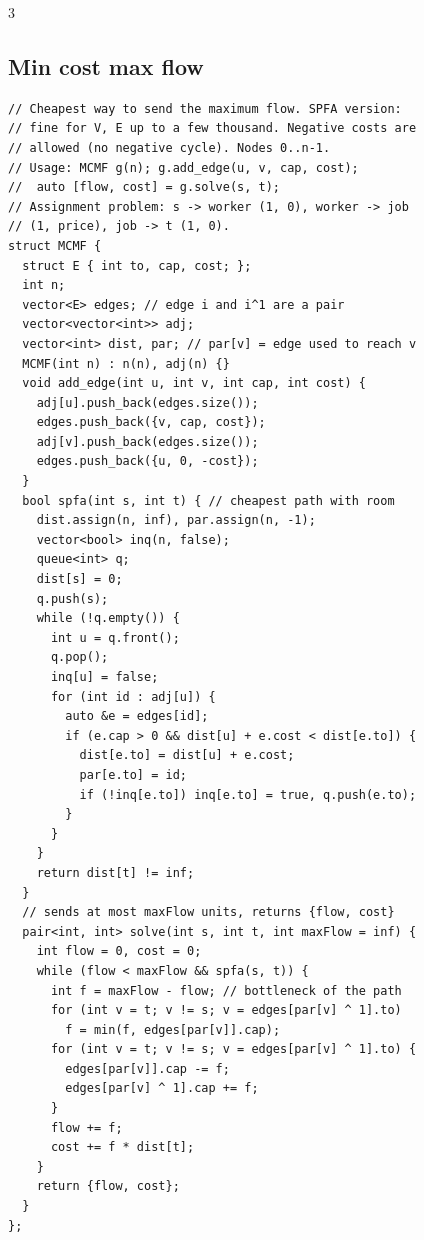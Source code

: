 \documentclass[8pt, a4paper]{article}
\begin{document}
\begin{multicols*}{3}
\subsection{Min cost max flow}
\begin{lstlisting}
// Cheapest way to send the maximum flow. SPFA version:
// fine for V, E up to a few thousand. Negative costs are
// allowed (no negative cycle). Nodes 0..n-1.
// Usage: MCMF g(n); g.add_edge(u, v, cap, cost);
//  auto [flow, cost] = g.solve(s, t);
// Assignment problem: s -> worker (1, 0), worker -> job
// (1, price), job -> t (1, 0).
struct MCMF {
  struct E { int to, cap, cost; };
  int n;
  vector<E> edges; // edge i and i^1 are a pair
  vector<vector<int>> adj;
  vector<int> dist, par; // par[v] = edge used to reach v
  MCMF(int n) : n(n), adj(n) {}
  void add_edge(int u, int v, int cap, int cost) {
    adj[u].push_back(edges.size());
    edges.push_back({v, cap, cost});
    adj[v].push_back(edges.size());
    edges.push_back({u, 0, -cost});
  }
  bool spfa(int s, int t) { // cheapest path with room
    dist.assign(n, inf), par.assign(n, -1);
    vector<bool> inq(n, false);
    queue<int> q;
    dist[s] = 0;
    q.push(s);
    while (!q.empty()) {
      int u = q.front();
      q.pop();
      inq[u] = false;
      for (int id : adj[u]) {
        auto &e = edges[id];
        if (e.cap > 0 && dist[u] + e.cost < dist[e.to]) {
          dist[e.to] = dist[u] + e.cost;
          par[e.to] = id;
          if (!inq[e.to]) inq[e.to] = true, q.push(e.to);
        }
      }
    }
    return dist[t] != inf;
  }
  // sends at most maxFlow units, returns {flow, cost}
  pair<int, int> solve(int s, int t, int maxFlow = inf) {
    int flow = 0, cost = 0;
    while (flow < maxFlow && spfa(s, t)) {
      int f = maxFlow - flow; // bottleneck of the path
      for (int v = t; v != s; v = edges[par[v] ^ 1].to)
        f = min(f, edges[par[v]].cap);
      for (int v = t; v != s; v = edges[par[v] ^ 1].to) {
        edges[par[v]].cap -= f;
        edges[par[v] ^ 1].cap += f;
      }
      flow += f;
      cost += f * dist[t];
    }
    return {flow, cost};
  }
};
\end{lstlisting}

\end{multicols*}
\end{document}
